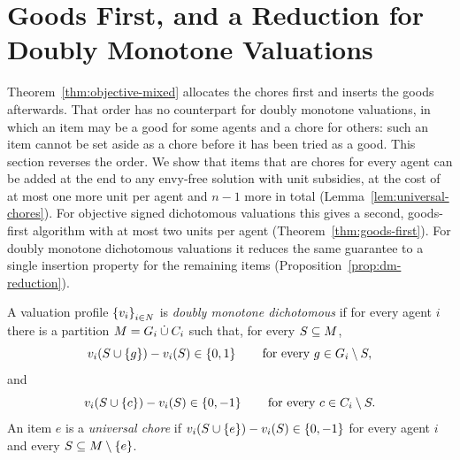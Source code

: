 \section{Goods First, and a Reduction for Doubly Monotone Valuations}
\label{sec:goods-first}

Theorem~\ref{thm:objective-mixed} allocates the chores first and inserts the
goods afterwards. That order has no counterpart for doubly monotone valuations,
in which an item may be a good for some agents and a chore for others: such an
item cannot be set aside as a chore before it has been tried as a good. This
section reverses the order. We show that items that are chores for every agent
can be added at the end to any envy-free solution with unit subsidies, at the
cost of at most one more unit per agent and $n-1$ more in total
(Lemma~\ref{lem:universal-chores}). For objective signed dichotomous valuations
this gives a second, goods-first algorithm with at most two units per agent
(Theorem~\ref{thm:goods-first}). For doubly monotone dichotomous valuations it
reduces the same guarantee to a single insertion property for the remaining
items (Proposition~\ref{prop:dm-reduction}).

\begin{definition}
\label{def:dm}
A valuation profile $\left\{v_i\right\}_{i\in N}$ is \emph{doubly monotone
dichotomous} if for every agent $i$ there is a partition
$M=G_i\mathbin{\dot\cup}C_i$ such that, for every $S\subseteq M$,
\[
  v_i(S\cup\left\{g\right\})-v_i(S)\in\left\{0,1\right\}
  \qquad\text{for every }g\in G_i\setminus S,
\]
and
\[
  v_i(S\cup\left\{c\right\})-v_i(S)\in\left\{0,-1\right\}
  \qquad\text{for every }c\in C_i\setminus S.
\]
An item $e$ is a \emph{universal chore} if
$v_i(S\cup\left\{e\right\})-v_i(S)\in\left\{0,-1\right\}$ for every agent $i$ and every
$S\subseteq M\setminus\left\{e\right\}$.
\end{definition}

